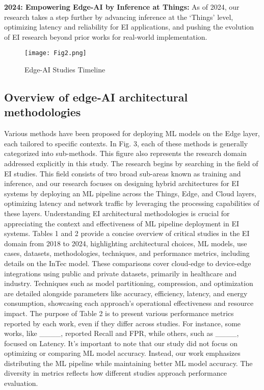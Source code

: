 	\textbf{2024: Empowering Edge-AI by Inference at Things:} As of 2024, our research takes a
	step further by advancing inference at the ‘Things’ level, optimizing latency and
	reliability for EI applications, and pushing the evolution of EI research beyond
	prior works for real-world implementation.
	
	\begin{figure}[t]
		\centering
		\texttt{[image: Fig2.png]}
		\caption{Edge-AI Studies Timeline}
	\end{figure}
	
	\subsection{ Overview of edge‑AI architectural methodologies}
	Various methods have been proposed for deploying ML models on the Edge layer, each
	tailored to specific contexts. In Fig. 3, each of these methods is generally categorized
	into sub-methods. This figure also represents the research domain addressed explicitly
	in this study. The research begins by searching in the field of EI studies. This field consists of two broad sub-areas known as training and inference, and our research focuses
	on designing hybrid architectures for EI systems by deploying an ML pipeline across
	the Things, Edge, and Cloud layers, optimizing latency and network traffic by leveraging the processing capabilities of these layers. Understanding EI architectural methodologies is crucial for appreciating the context and effectiveness of ML pipeline deployment in EI systems. Tables 1 and 2 provide a concise overview of critical studies in
	the EI domain from 2018 to 2024, highlighting architectural choices, ML models, use
	cases, datasets, methodologies, techniques, and performance metrics, including details
	on the InTec model. These comparisons cover cloud-edge to device-edge integrations
	using public and private datasets, primarily in healthcare and industry. Techniques such
	as model partitioning, compression, and optimization are detailed alongside parameters like accuracy, efficiency, latency, and energy consumption, showcasing each approach’s
	operational effectiveness and resource impact. The purpose of Table 2 is to present various performance metrics reported by each work, even if they differ across studies. For
	instance, some works, like ____, reported Recall and FPR, while others, such as ____, focused on Latency. It’s important to note that our study did not focus on optimizing
	or comparing ML model accuracy. Instead, our work emphasizes distributing the ML
	pipeline while maintaining better ML model accuracy. The diversity in metrics reflects
	how different studies approach performance evaluation.
	
